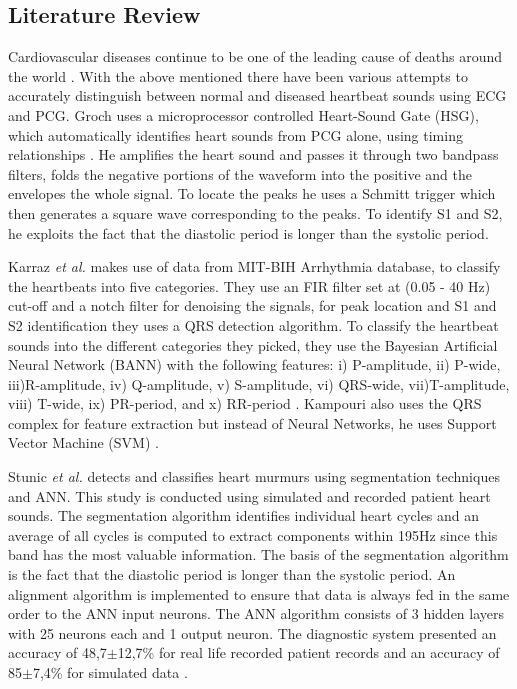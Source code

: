 \documentclass[10pt,twocolumn]{witseiepaper}
\begin{document}
\subsection{Literature Review}
Cardiovascular diseases continue to be one of the leading cause of deaths around the world \cite{WHO}.  With the above mentioned there have been various attempts to accurately distinguish between normal and diseased heartbeat sounds using ECG and PCG.  Groch uses a microprocessor controlled Heart-Sound Gate (HSG), which automatically identifies heart sounds from PCG alone, using timing relationships \cite{groch1992new}. He amplifies the heart sound and passes it through two bandpass filters, folds the negative portions of the waveform into the positive and the envelopes the whole signal. To locate the peaks he uses a Schmitt trigger which then generates a square wave corresponding to the peaks. To identify S1 and S2, he exploits the fact that the diastolic period is longer than the systolic period. 

Karraz \textit{et al.} makes use of data from MIT-BIH Arrhythmia database, to classify the heartbeats into five categories. They use an FIR filter set at (0.05 - 40 Hz) cut-off and a notch filter for denoising the signals, for peak location and S1 and S2 identification they uses a QRS detection algorithm. To classify the heartbeat sounds into the different categories they picked, they use the Bayesian Artificial Neural Network (BANN) with the following features: i) P-amplitude, ii) P-wide, iii)R-amplitude, iv) Q-amplitude, v) S-amplitude, vi) QRS-wide, vii)T-amplitude, viii) T-wide, ix) PR-period, and x) RR-period \cite{karraz2006automatic}. Kampouri  also uses the QRS complex for feature extraction but instead of Neural Networks, he uses Support Vector Machine (SVM) \cite{kampouraki2008heartbeat}.


Stunic \textit{et al.} detects and classifies heart murmurs using segmentation techniques and ANN. This study is conducted using simulated and recorded patient heart sounds. The segmentation algorithm identifies individual heart cycles and an average of all cycles is computed to extract components within 195Hz since this band has the most valuable information. The basis of the segmentation algorithm is the fact that the diastolic period is longer than the systolic period. An alignment algorithm is implemented to ensure that data is always fed in the same order to the ANN input neurons. The ANN algorithm consists of 3 hidden layers with 25 neurons each and 1 output neuron. The diagnostic system presented an accuracy of 48,7$\pm$12,7\% for real life recorded patient records and an accuracy of 85$\pm$7,4\% for simulated data \cite{strunic}.
\end{document}
